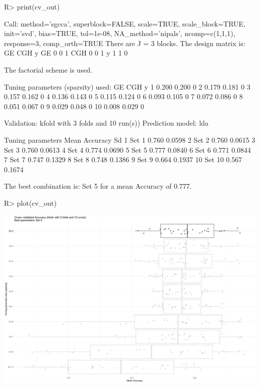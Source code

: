 \documentclass[
]{jss}
\begin{document}
\begin{CodeChunk}
\begin{CodeInput}
R> print(cv_out)
\end{CodeInput}
\begin{CodeOutput}
Call: method='sgcca', superblock=FALSE, scale=TRUE, scale_block=TRUE, init='svd',
bias=TRUE, tol=1e-08, NA_method='nipals', ncomp=c(1,1,1), response=3,
comp_orth=TRUE 
There are J = 3 blocks.
The design matrix is:
    GE CGH y
GE   0   0 1
CGH  0   0 1
y    1   1 0

The factorial scheme is used.

Tuning parameters (sparsity) used: 
      GE   CGH y
1  0.200 0.200 0
2  0.179 0.181 0
3  0.157 0.162 0
4  0.136 0.143 0
5  0.115 0.124 0
6  0.093 0.105 0
7  0.072 0.086 0
8  0.051 0.067 0
9  0.029 0.048 0
10 0.008 0.029 0

Validation: kfold with 3 folds and 10 run(s)) 
Prediction model: lda 

   Tuning parameters Mean Accuracy     Sd
1              Set 1         0.760 0.0598
2              Set 2         0.760 0.0615
3              Set 3         0.760 0.0613
4              Set 4         0.774 0.0690
5              Set 5         0.777 0.0840
6              Set 6         0.771 0.0844
7              Set 7         0.747 0.1329
8              Set 8         0.748 0.1386
9              Set 9         0.664 0.1937
10            Set 10         0.567 0.1674

The best combination is: Set 5 for a mean Accuracy of 0.777.
\end{CodeOutput}
\end{CodeChunk}

\normalsize

\footnotesize

\begin{CodeChunk}
\begin{CodeInput}
R> plot(cv_out)
\end{CodeInput}


\begin{center}\includegraphics{RGCCA_files/figure-latex/unnamed-chunk-43-1} \end{center}

\end{CodeChunk}
\end{document}
